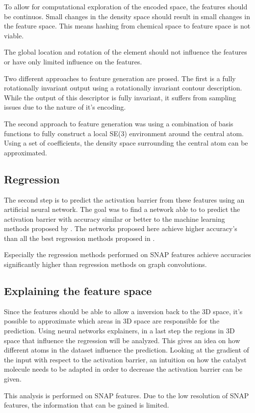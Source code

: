 To allow for computational exploration of the encoded space, the features should be continuos.
Small changes in the density space should result in small changes in the 
feature space. 
This means hashing from chemical space to feature space is not viable.

The global location and rotation of the element should not influence the features or have only limited influence on the features.

Two different approaches to feature generation are prosed.
The first is a fully rotationally invariant output using a rotationally invariant contour description.
While the output of this descriptor is fully invariant, it suffers from sampling issues due to the nature of it's encoding.

The second approach to feature generation was using a combination of basis functions to fully construct a local SE(3) environment around the central atom.
Using a set of coefficients, the density space surrounding the central atom can be approximated.

\subsection{Regression}

The second step is to predict the activation barrier from these features using an artificial neural network.
The goal was to find a network able to to predict the activation barrier with accuracy similar or better to the machine learning methods proposed by \citeauthor{friederich_dos}.
The networks proposed here achieve higher accuracy's than all the best regression methods proposed in \cite{friederich_dos}.

Especially the regression methods performed on SNAP features achieve accuracies significantly higher than regression methods on graph convolutions.

\subsection{Explaining the feature space}
Since the features should be able to allow a inversion back to the 3D space, it's possible to approximate which areas in 3D space are responsible for the prediction.
Using neural networks explainers, in  a last step the regions in 3D space that influence the regression will be analyzed.
This gives an idea on how different atoms in the dataset influence the prediction.
Looking at the gradient of the input with respect to the activation barrier, an intuition on how the catalyst molecule needs to be 
adapted in order to decrease the activation barrier can be given.

This analysis is performed on SNAP features. 
Due to the low resolution of SNAP features, the information that can be gained is limited.